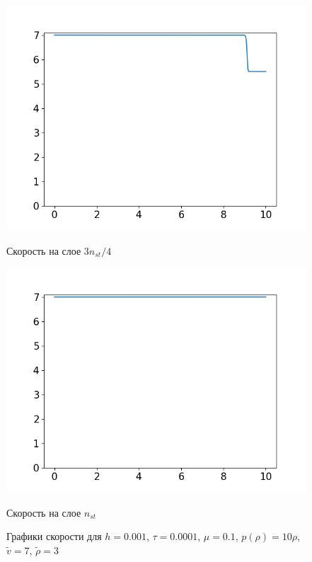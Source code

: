 \begin{figure}[h]
\begin{minipage}[h]{0.47\linewidth}
		\includegraphics[width=1\linewidth]{pics/task4/34u_1.png} 
		\caption{Скорость на слое $3n_{st} / 4$}
	\end{minipage}
	\hfill
	\begin{minipage}[h]{0.47\linewidth}
		\centering
		\includegraphics[width=1\linewidth]{pics/task4/44u_1.png} 
		\caption{Скорость на слое $n_{st}$}
	\end{minipage}
	\caption{Графики скорости для $h = 0.001$, $\tau = 0.0001$, $\mu = 0.1$, $p(\rho) = 10\rho$, $\tilde{v} = 7$, $\tilde{\rho} = 3 $}
\end{figure}


